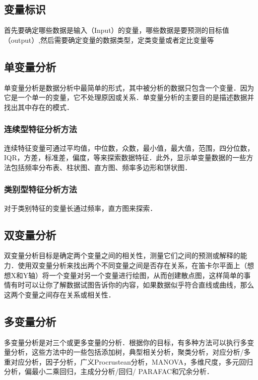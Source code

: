 \subsection{变量标识}
首先要确定哪些数据是输入（Input）的变量，哪些数据是要预测的目标值（output）,然后需要确定变量的数据类型，定类变量或者定比变量等
\subsection{单变量分析}
单变量分析是数据分析中最简单的形式，其中被分析的数据只包含一个变量．因为它是一个单一的变量，它不处理原因或关系．单变量分析的主要目的是描述数据并找出其中存在的模式．  
\subsubsection{连续型特征分析方法}
连续特征变量可通过平均值，中位数，众数，最小值，最大值，范围，四分位数，IQR，方差，标准差，偏度，等来探索数据特征．此外，显示单变量数据的一些方法包括频率分布表、柱状图、直方图、频率多边形和饼状图．
\subsubsection{类别型特征分析方法}
对于类别特征的变量长通过频率，直方图来探索．
\subsection{双变量分析}
双变量分析目标是确定两个变量之间的相关性，测量它们之间的预测或解释的能力．使用双变量分析来找出两个不同变量之间是否存在关系，在笛卡尔平面上（想想X和Y轴）将一个变量对另一个变量进行绘图，从而创建散点图，这样简单的事情有时可以让你了解数据试图告诉你的内容，如果数据似乎符合直线或曲线，那么这两个变量之间存在关系或相关性．
\subsection{多变量分析}
多变量分析是对三个或更多变量的分析．根据你的目标，有多种方法可以执行多变量分析，这些方法中的一些包括添加树，典型相关分析，聚类分析，对应分析/多重对应分析，因子分析，广义Procrustean分析，MANOVA，多维尺度，多元回归分析，偏最小二乘回归，主成分分析/回归/ PARAFAC和冗余分析．
